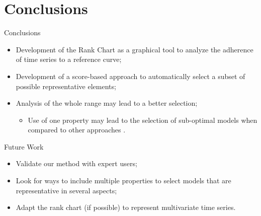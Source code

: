 \documentclass{beamer}
\begin{document}
\section{Conclusions}
\begin{frame}
  \tableofcontents[currentsection]
\end{frame}

\begin{frame}{Conclusions}
  \begin{itemize}
    \item Development of the Rank Chart as a graphical tool to analyze the adherence of time series to a reference curve;
    \item Development of a score-based approach to automatically select a subset of possible representative elements;
    \item Analysis of the whole range may lead to a better selection;
    \begin{itemize}
      \item Use of one property may lead to the selection of sub-optimal models when compared to other approaches  .
    \end{itemize}
  \end{itemize}
\end{frame}

\begin{frame}{Future Work}
  \begin{itemize}
    \item Validate our method with expert users;
    \item Look for ways to include multiple properties to select models that are representative in several aspects;
    \item Adapt the rank chart (if possible) to represent multivariate time series.
  \end{itemize}
\end{frame}

\section{}
\begin{frame}
  \titlepage
\end{frame}
\end{document}
